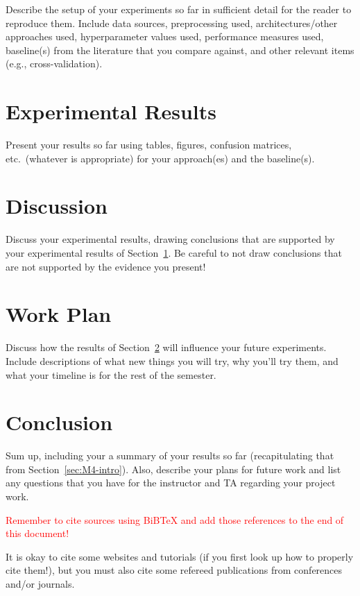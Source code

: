 \documentclass{report}
\begin{document}
Describe the setup of your experiments so far in sufficient detail for the reader to reproduce them.  Include data sources, preprocessing used, architectures/other approaches used, hyperparameter values used, performance measures used, baseline(s) from the literature that you compare against, and other relevant items (e.g., cross-validation).

\section{Experimental Results}
\label{sec:M4-results}

Present your results so far using tables, figures, confusion matrices, etc.\ (whatever is appropriate) for  your approach(es) and the baseline(s). 

\section{Discussion}
\label{sec:M4-discussion}

Discuss your experimental results, drawing conclusions that are supported by your experimental results of Section~\ref{sec:M4-results}.  Be careful to not draw conclusions that are not supported by the evidence you present! 


\section{Work Plan}

Discuss how the results of Section~\ref{sec:M4-discussion} will influence your future experiments.  Include descriptions of what new things you will try, why you'll try them, and what your timeline is for the rest of the semester. 

\section{Conclusion}

Sum up, including your a summary of your results so far (recapitulating that from Section~\ref{sec:M4-intro}).  Also, describe your plans for future work and list any questions that you have for the instructor and TA regarding your project work.

\textcolor{red}{Remember to cite sources using BiBTeX and add those references to the end of this document!}

It is okay to cite some websites and tutorials (if you first look up how to properly cite them!), but you must also cite some refereed publications from conferences and/or journals.
\end{document}
